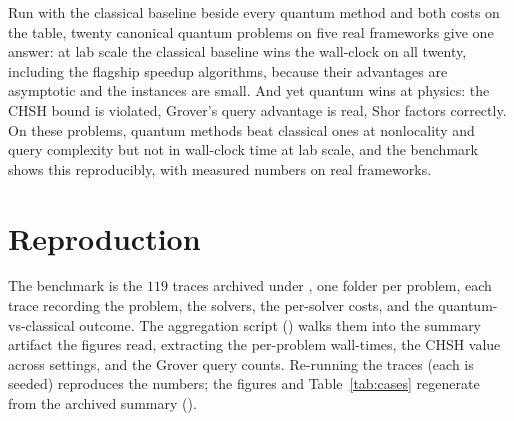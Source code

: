 \documentclass[journal]{IEEEtran}
\begin{document}
Run with the classical baseline beside every quantum method and both costs on the table, twenty
canonical quantum problems on five real frameworks give one answer: at lab scale the classical baseline wins the
wall-clock on all twenty, including the flagship speedup algorithms, because their advantages are asymptotic and
the instances are small. And yet quantum wins at physics: the CHSH bound is violated, Grover's query
advantage is real, Shor factors correctly. On these problems, quantum methods beat classical ones at
nonlocality and query complexity but not in wall-clock time at lab scale, and the benchmark shows this
reproducibly, with measured numbers on real frameworks.

\appendices
\section{Reproduction}\label{app:repro}

{\raggedright
The benchmark is the $119$ traces archived under , one folder per problem, each trace
recording the problem, the solvers, the per-solver costs, and the quantum-vs-classical outcome. The
aggregation script () walks them into the summary
artifact the figures read, extracting the per-problem wall-times, the CHSH value across settings, and the Grover
query counts. Re-running the traces (each is seeded) reproduces the numbers; the figures and
Table~\ref{tab:cases} regenerate from the archived summary
().\par}

\balance
\end{document}
